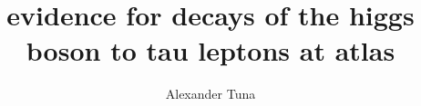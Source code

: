 \title{evidence for decays of the higgs boson to tau leptons at atlas}
    
\author{Alexander Tuna}

\newcommand{\adviser}{H.H. Williams, Professor, Physics}
\newcommand{\advisershort}{H.H. Williams}
\newcommand{\myinstitution}{The Univeristy of Pennsylvania}
\newcommand{\chairperson}{Marija Drndic, Professor, Physics}

\newcommand{\committeeOne}{Randall Kamien, Professor, Physics}
\newcommand{\committeeTwo}{I. Joseph Kroll, Professor, Physics}
\newcommand{\committeeThree}{Elliot Lipeles, Assistant Professor, Physics}
\newcommand{\committeeFour}{Burt Ovrut, Professor, Physics}



